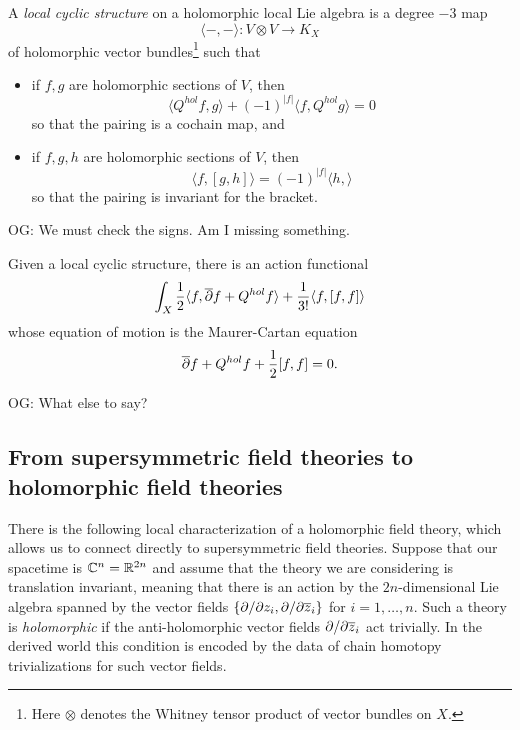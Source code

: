 \documentclass[11pt]{amsart}
\def\del{\partial}
\def\owen#1{{\textcolor{violet!50!black}{OG: {#1}}}}
\begin{document}
\begin{dfn}
A {\em local cyclic structure} on a holomorphic local Lie algebra is a degree $-3$ map
\[
\langle -,-\rangle: V \otimes V \to K_X
\]
of holomorphic vector bundles\footnote{Here $\otimes$ denotes the Whitney tensor product of vector bundles on $X$.} such that 
\begin{itemize}
\item if $f, g$ are holomorphic sections of $V$, then 
\[
\langle Q^{hol}f, g \rangle + (-1)^{|f|} \langle f, Q^{hol} g \rangle = 0
\]
so that the pairing is a cochain map, and
\item if $f, g, h$ are holomorphic sections of $V$, then 
\[
\langle f, [g,h] \rangle = (-1)^{|f|} \langle h,  \rangle
\]
so that the pairing is invariant for the bracket.
\end{itemize}
\owen{We must check the signs. Am I missing something.}
\end{dfn}

Given a local cyclic structure, there is an action functional
\[
\int_X \frac{1}{2} \langle f, {\overline{\partial}} f + Q^{hol} f \rangle + \frac{1}{3!} \langle f, [f,f] \rangle 
\]
whose equation of motion is the Maurer-Cartan equation
\[
{\overline{\partial}} f + Q^{hol}f + \frac{1}{2} [f,f] = 0.
\]

\owen{What else to say?}

%





\subsection{From supersymmetric field theories to holomorphic field theories}



There is the following local characterization of a holomorphic field theory, 
which allows us to connect directly to supersymmetric field theories. 
Suppose that our spacetime is $\mathbb C^n = \mathbb R^{2n}$ and assume that the theory we are considering is translation invariant, 
meaning that there is an action by the $2n$-dimensional Lie algebra spanned by the vector fields $\{\del / \del {z_i}, \del / \del {\zbar_i}\}$ for $i=1,\ldots,n$. 
Such a theory is {\em holomorphic} if the anti-holomorphic vector fields $\del / \del {\zbar_i}$ act trivially. 
In the derived world this condition is encoded by the data of chain homotopy trivializations for such vector fields. 
\end{document}

